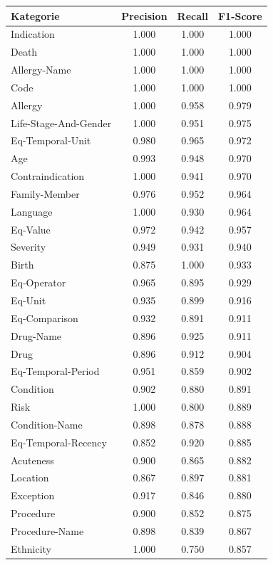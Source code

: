 \begin{table}[htbp]
\centering
\begin{tabular}{p{5cm}ccc}
\toprule
\textbf{Kategorie} & \textbf{Precision} & \textbf{Recall} & \textbf{F1-Score} \\
\midrule
Indication & 1.000 & 1.000 & 1.000 \\
Death & 1.000 & 1.000 & 1.000 \\
Allergy-Name & 1.000 & 1.000 & 1.000 \\
Code & 1.000 & 1.000 & 1.000 \\
Allergy & 1.000 & 0.958 & 0.979 \\
Life-Stage-And-Gender & 1.000 & 0.951 & 0.975 \\
Eq-Temporal-Unit & 0.980 & 0.965 & 0.972 \\
Age & 0.993 & 0.948 & 0.970 \\
Contraindication & 1.000 & 0.941 & 0.970 \\
Family-Member & 0.976 & 0.952 & 0.964 \\
Language & 1.000 & 0.930 & 0.964 \\
Eq-Value & 0.972 & 0.942 & 0.957 \\
Severity & 0.949 & 0.931 & 0.940 \\
Birth & 0.875 & 1.000 & 0.933 \\
Eq-Operator & 0.965 & 0.895 & 0.929 \\
Eq-Unit & 0.935 & 0.899 & 0.916 \\
Eq-Comparison & 0.932 & 0.891 & 0.911 \\
Drug-Name & 0.896 & 0.925 & 0.911 \\
Drug & 0.896 & 0.912 & 0.904 \\
Eq-Temporal-Period & 0.951 & 0.859 & 0.902 \\
Condition & 0.902 & 0.880 & 0.891 \\
Risk & 1.000 & 0.800 & 0.889 \\
Condition-Name & 0.898 & 0.878 & 0.888 \\
Eq-Temporal-Recency & 0.852 & 0.920 & 0.885 \\
Acuteness & 0.900 & 0.865 & 0.882 \\
Location & 0.867 & 0.897 & 0.881 \\
Exception & 0.917 & 0.846 & 0.880 \\
Procedure & 0.900 & 0.852 & 0.875 \\
Procedure-Name & 0.898 & 0.839 & 0.867 \\
Ethnicity & 1.000 & 0.750 & 0.857 \\

\end{tabular}
\end{table}
